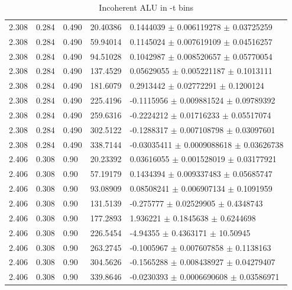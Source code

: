 \begin{table}[!h]
\begin{center}
\begin{tabular}{||l|l|l|l|l||}
         \hline
   2.308 & 0.284 & 0.490 & 20.40386 & 0.1444039   $\pm$    0.006119278   $\pm$  
0.03725259 \\
   2.308 & 0.284 & 0.490 & 59.94014 & 0.1145024   $\pm$    0.007619109   $\pm$  0.04516257 \\
   2.308 & 0.284 & 0.490 & 94.51028 & 0.1042987   $\pm$    0.008520657   $\pm$  0.05770054 \\
   2.308 & 0.284 & 0.490 & 137.4529 & 0.05629055  $\pm$    0.005221187   $\pm$  0.1013111  \\
   2.308 & 0.284 & 0.490 & 181.6079 & 0.2913442   $\pm$    0.02772291    $\pm$  0.1200124  \\
   2.308 & 0.284 & 0.490 & 225.4196 & -0.1115956  $\pm$    0.009881524   $\pm$  0.09789392 \\
   2.308 & 0.284 & 0.490 & 259.6316 & -0.2224212  $\pm$    0.01716233    $\pm$  0.05517074 \\
   2.308 & 0.284 & 0.490 & 302.5122 & -0.1288317  $\pm$    0.007108798   $\pm$  0.03097601 \\
   2.308 & 0.284 & 0.490 & 338.7144 & -0.03035411 $\pm$    0.0009088618  $\pm$  0.03626738 \\

         \hline
   2.406 & 0.308 & 0.90 & 20.23392 & 0.03616055   $\pm$   0.001528019  $\pm$   
0.03177921  \\
   2.406 & 0.308 & 0.90 & 57.19179 & 0.1434394    $\pm$   0.009337483  $\pm$   0.05685747  \\
   2.406 & 0.308 & 0.90 & 93.08909 & 0.08508241   $\pm$   0.006907134  $\pm$   0.1091959   \\
   2.406 & 0.308 & 0.90 & 131.5139 & -0.275777    $\pm$   0.02529905   $\pm$   0.4348743   \\
   2.406 & 0.308 & 0.90 & 177.2893 & 1.936221     $\pm$   0.1845638    $\pm$   0.6244698   \\ 
   2.406 & 0.308 & 0.90 & 226.5454 & -4.94355     $\pm$   0.4363171    $\pm$   10.50945    \\
   2.406 & 0.308 & 0.90 & 263.2745 & -0.1005967   $\pm$   0.007607858  $\pm$   0.1138163   \\
   2.406 & 0.308 & 0.90 & 304.5626 & -0.1565288   $\pm$   0.008438927  $\pm$   0.04279407  \\
   2.406 & 0.308 & 0.90 & 339.8646 & -0.0230393   $\pm$   0.0006690608 $\pm$   0.03586971  \\


         \hline
         \hline
      \end{tabular}
      \caption{Incoherent ALU in -t bins}
      \label{table:InCoh_t_BSA}
   \end{center}
\end{table}



